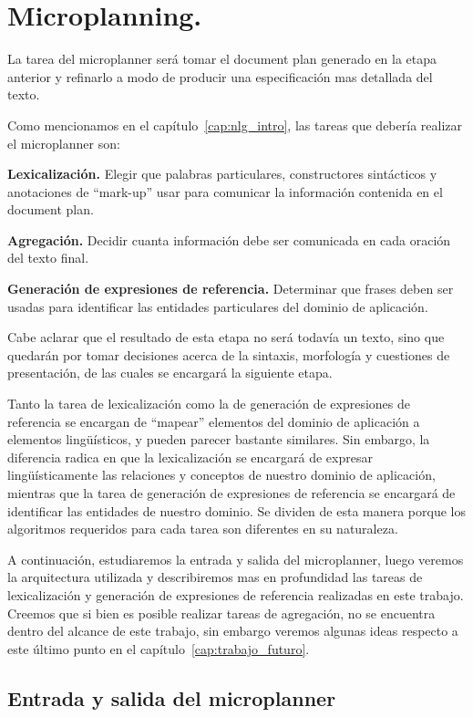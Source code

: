 \chapter{Microplanning.}
\label{cap:microplanning}
La tarea del microplanner será tomar el document plan generado en la etapa anterior y refinarlo a modo de producir una especificación mas detallada del texto. 

Como mencionamos en el capítulo~\ref{cap:nlg_intro}, las tareas que debería realizar el microplanner son:

\medskip
\noindent
\textbf{Lexicalización.} Elegir que palabras particulares, constructores sintácticos y anotaciones de ``mark-up'' usar para comunicar la información contenida en el document plan.

\medskip
\noindent
\textbf{Agregación.} Decidir cuanta información debe ser comunicada en cada oración del texto final.

\medskip
\noindent
\textbf{Generación de expresiones de referencia.} Determinar que frases deben ser usadas para identificar las entidades particulares del dominio de aplicación.

\medskip
Cabe aclarar que el resultado de esta etapa no será todavía un texto, sino que quedarán por tomar decisiones acerca de la sintaxis, morfología y cuestiones de presentación, de las cuales se encargará la siguiente etapa.

Tanto la tarea de lexicalización como la de generación de expresiones de referencia se encargan de ``mapear'' elementos del dominio de aplicación a elementos lingüísticos, y pueden parecer bastante similares. Sin embargo, la diferencia radica en que la lexicalización se encargará de expresar lingüísticamente las relaciones y conceptos de nuestro dominio de aplicación, mientras que la tarea de generación de expresiones de referencia se encargará de identificar las entidades de nuestro dominio. Se dividen de esta manera porque los algoritmos requeridos para cada tarea son diferentes en su naturaleza.

A continuación, estudiaremos la entrada y salida del microplanner, luego veremos la arquitectura utilizada y describiremos mas en profundidad las tareas de lexicalización y generación de expresiones de referencia realizadas en este trabajo. Creemos que si bien es posible realizar tareas de agregación, no se encuentra dentro del alcance de este trabajo, sin embargo veremos algunas ideas respecto a este último punto en el capítulo~\ref{cap:trabajo_futuro}.

\section{Entrada y salida del microplanner}

